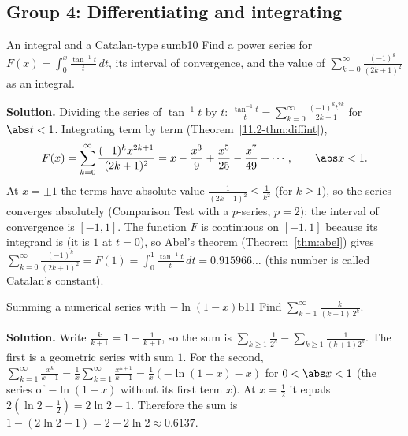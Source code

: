 \documentclass[11pt]{article}
\begin{document}
\subsection*{Group 4: Differentiating and integrating}

\begin{exmp}{An integral and a Catalan-type sum}{b10}
Find a power series for $F(x)=\displaystyle\int_0^x\frac{\tan^{-1}t}t\,dt$, its interval of convergence, and the value of $\displaystyle\sum_{k=0}^\infty\frac{(-1)^k}{(2k+1)^2}$ as an integral.

\textbf{Solution.} Dividing the series of $\tan^{-1}t$ by $t$: $\frac{\tan^{-1}t}t=\sum_{k=0}^\infty\frac{(-1)^kt^{2k}}{2k+1}$ for $\abs t<1$. Integrating term by term (Theorem~\ref{11.2-thm:diffint}),
\[
F(x)=\sum_{k=0}^\infty\frac{(-1)^kx^{2k+1}}{(2k+1)^2}=x-\frac{x^3}9+\frac{x^5}{25}-\frac{x^7}{49}+\cdots,\qquad\abs x<1 .
\]
At $x=\pm1$ the terms have absolute value $\frac1{(2k+1)^2}\le\frac1{k^2}$ (for $k\ge1$), so the series converges absolutely (Comparison Test with a $p$-series, $p=2$): the interval of convergence is $[-1,1]$. The function $F$ is continuous on $[-1,1]$ because its integrand is (it is $1$ at $t=0$), so Abel's theorem (Theorem~\ref{thm:abel}) gives $\sum_{k=0}^\infty\frac{(-1)^k}{(2k+1)^2}=F(1)=\int_0^1\frac{\tan^{-1}t}t\,dt=0.915966\ldots$ (this number is called Catalan's constant).
\end{exmp}

\begin{exmp}{Summing a numerical series with $-\ln(1-x)$}{b11}
Find $\displaystyle\sum_{k=1}^\infty\frac k{(k+1)\,2^k}$.

\textbf{Solution.} Write $\frac k{k+1}=1-\frac1{k+1}$, so the sum is $\sum_{k\ge1}\frac1{2^k}-\sum_{k\ge1}\frac1{(k+1)2^k}$. The first is a geometric series with sum $1$. For the second, $\sum_{k=1}^\infty\frac{x^k}{k+1}=\frac1x\sum_{k=1}^\infty\frac{x^{k+1}}{k+1}=\frac1x\left(-\ln(1-x)-x\right)$ for $0<\abs x<1$ (the series of $-\ln(1-x)$ without its first term $x$). At $x=\frac12$ it equals $2\left(\ln2-\frac12\right)=2\ln2-1$. Therefore the sum is $1-(2\ln2-1)=2-2\ln2\approx0.6137$.
\end{exmp}
\end{document}
